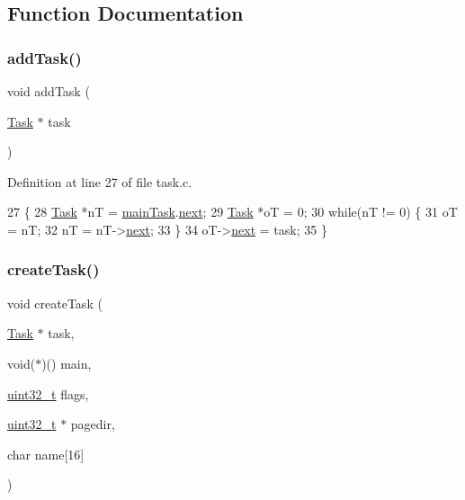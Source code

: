 \subsection{Function Documentation}
\mbox{\label{a00047_a2814ff5e4f081736448dc705b05edcd1_a2814ff5e4f081736448dc705b05edcd1}} 
\subsubsection{\texorpdfstring{add\+Task()}{addTask()}}
{\footnotesize\ttfamily void add\+Task (\begin{DoxyParamCaption}\item[{\hyperlink{a00136}{Task} $\ast$}]{task }\end{DoxyParamCaption})}



Definition at line 27 of file task.\+c.


\begin{DoxyCode}
27                          \{
28     \hyperlink{a00136}{Task} *nT = \hyperlink{a00047_a228ac88416ebaa8713846e3e5e3e9b6d_a228ac88416ebaa8713846e3e5e3e9b6d}{mainTask}.\hyperlink{a00136_a8b6b50960a19f7bae344ef0cc8ec4e7d_a8b6b50960a19f7bae344ef0cc8ec4e7d}{next};
29     \hyperlink{a00136}{Task} *oT = 0;
30     \textcolor{keywordflow}{while}(nT != 0) \{
31         oT = nT;
32         nT = nT->\hyperlink{a00136_a8b6b50960a19f7bae344ef0cc8ec4e7d_a8b6b50960a19f7bae344ef0cc8ec4e7d}{next};
33     \}
34     oT->\hyperlink{a00136_a8b6b50960a19f7bae344ef0cc8ec4e7d_a8b6b50960a19f7bae344ef0cc8ec4e7d}{next} = task;
35 \}
\end{DoxyCode}
\mbox{\label{a00047_ad60a944f16bf46088320833cf2464e1e_ad60a944f16bf46088320833cf2464e1e}} 
\subsubsection{\texorpdfstring{create\+Task()}{createTask()}}
{\footnotesize\ttfamily void create\+Task (\begin{DoxyParamCaption}\item[{\hyperlink{a00136}{Task} $\ast$}]{task,  }\item[{void($\ast$)()}]{main,  }\item[{\hyperlink{a00095_a435d1572bf3f880d55459d9805097f62_a435d1572bf3f880d55459d9805097f62}{uint32\+\_\+t}}]{flags,  }\item[{\hyperlink{a00095_a435d1572bf3f880d55459d9805097f62_a435d1572bf3f880d55459d9805097f62}{uint32\+\_\+t} $\ast$}]{pagedir,  }\item[{char}]{name\mbox{[}16\mbox{]} }\end{DoxyParamCaption})}



